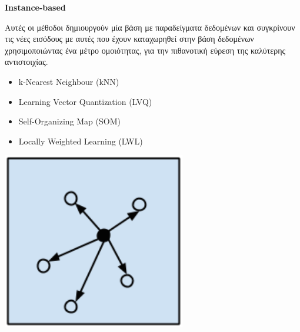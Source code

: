 \newpage

\begin{minipage}{0.5\textwidth}

  \textbf{\large Instance-based}

  Αυτές οι μέθοδοι δημιουργούν μία βάση με
  παραδείγματα δεδομένων και συγκρίνουν τις νέες εισόδους με αυτές που έχουν
  καταχωρηθεί στην βάση δεδομένων χρησιμοποιώντας ένα μέτρο ομοιότητας,
  για την πιθανοτική εύρεση της καλύτερης αντιστοιχίας.
  \begin{itemize}
    \setlength\itemsep{0em}
    \item{k-Nearest Neighbour (kNN)}
    \item{Learning Vector Quantization (LVQ)}
    \item{Self-Organizing Map (SOM)}
    \item{Locally Weighted Learning (LWL)}
  \end{itemize}
\end{minipage}
\begin{minipage}{0.5\textwidth}
  \begin{center}
    \includegraphics[width=0.6\textwidth]{./images/chapter3/instance_based_algorithms.png}
  \end{center}
\end{minipage}

